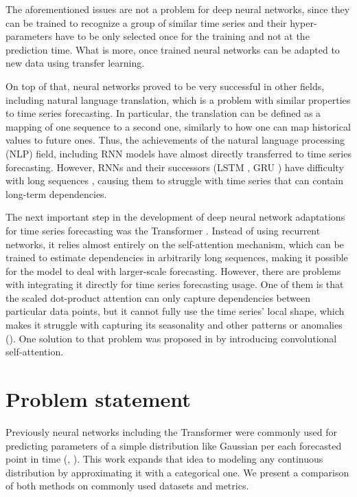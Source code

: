 \documentclass[en]{pracamgr}
\begin{document}
	
	The aforementioned issues are not a problem for deep neural networks, since they can be trained to recognize a group of similar time series and their hyper-parameters have to be only selected once for the training and not at the prediction time. What is more, once trained neural networks can be adapted to new data using transfer learning. 
	
	On top of that, neural networks proved to be very successful in other fields, including natural language translation, which is a problem with similar properties to time series forecasting. In particular, the translation can be defined as a mapping of one sequence to a second one, similarly to how one can map historical values to future ones. Thus, the achievements of the natural language processing (NLP) field, including RNN models have almost directly transferred to time series forecasting. However, RNNs and their successors (LSTM \cite{lstm}, GRU \cite{gru}) have difficulty with long sequences \cite{context}, causing them to struggle with time series that can contain long-term dependencies.
	
	The next important step in the development of deep neural network adaptations for time series forecasting was the Transformer \cite{tr}. Instead of using recurrent networks, it relies almost entirely on the self-attention mechanism, which can be trained to estimate dependencies in arbitrarily long sequences, making it possible for the model to deal with larger-scale forecasting.
	However, there are problems with integrating it directly for time series forecasting usage. One of them is that the scaled dot-product attention can only capture dependencies between particular data points, but it cannot fully use the time series' local shape, which makes it struggle with capturing its seasonality and other patterns or anomalies (\cite{enhancing}).
	One solution to that problem was proposed in \cite{enhancing} by introducing convolutional self-attention.
	
	
	
	\section*{Problem statement}\label{r:problemst}
	
	Previously neural networks including the Transformer were commonly used for predicting parameters of a simple distribution like Gaussian per each forecasted point in time (\cite{deepar}, \cite{enhancing}). This work expands that idea to modeling any continuous distribution by approximating it with a categorical one. We present a comparison of both methods on commonly used datasets and metrics.
	
\end{document}
